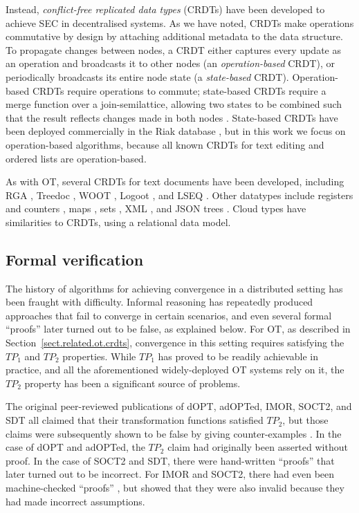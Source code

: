 Instead, \emph{conflict-free replicated data types} (CRDTs) have been developed to achieve SEC in decentralised systems.
As we have noted, CRDTs make operations commutative by design by attaching additional metadata to the data structure.
To propagate changes between nodes, a CRDT either captures every update as an operation and broadcasts it to other nodes (an \emph{operation-based} CRDT), or periodically broadcasts its entire node state (a \emph{state-based} CRDT).
Operation-based CRDTs require operations to commute; state-based CRDTs require a merge function over a join-semilattice, allowing two states to be combined such that the result reflects changes made in both nodes \cite{Shapiro:2011wy,Shapiro:2011un}.
State-based CRDTs have been deployed commercially in the Riak database \cite{Brown:2014hs}, but in this work we focus on operation-based algorithms, because all known CRDTs for text editing and ordered lists are operation-based.

As with OT, several CRDTs for text documents have been developed, including RGA \cite{Roh:2011dw}, Treedoc \cite{Preguica:2009fz}, WOOT \cite{Oster:2006wj}, Logoot \cite{Weiss:2010hx}, and LSEQ \cite{Nedelec:2013ky,Nedelec:2016eo}.
Other datatypes include registers and counters \cite{Shapiro:2011wy,Shapiro:2011un}, maps \cite{Baquero:2016iv}, sets \cite{Bieniusa:2012wu,Bieniusa:2012gt}, XML \cite{Martin:2010ih}, and JSON trees \cite{Kleppmann:2016ve}.
Cloud types \cite{Burckhardt:2012jy} have similarities to CRDTs, using a relational data model.


\subsection{Formal verification}\label{sect.related.verification}

The history of algorithms for achieving convergence in a distributed setting has been fraught with difficulty.
Informal reasoning has repeatedly produced approaches that fail to converge in certain scenarios, and even several formal ``proofs'' later turned out to be false, as explained below.
For OT, as described in Section~\ref{sect.related.ot.crdts}, convergence in this setting requires satisfying the $\mathit{TP}_1$ and $\mathit{TP}_2$ properties.
While $\mathit{TP}_1$ has proved to be readily achievable in practice, and all the aforementioned widely-deployed OT systems rely on it, the $\mathit{TP}_2$ property has been a significant source of problems.

The original peer-reviewed publications of dOPT, adOPTed, IMOR, SOCT2, and SDT all claimed that their transformation functions satisfied $\mathit{TP}_2$, but those claims were subsequently shown to be false by giving counter-examples \cite{Imine:2003ks,Imine:2006kn,Oster:2005vi}.
In the case of dOPT and adOPTed, the $\mathit{TP}_2$ claim had originally been asserted without proof.
In the case of SOCT2 and SDT, there were hand-written ``proofs'' that later turned out to be incorrect.
For IMOR and SOCT2, there had even been machine-checked ``proofs'' \cite{Imine:2003ks}, but \citet{Oster:2005vi} showed that they were also invalid because they had made incorrect assumptions.

